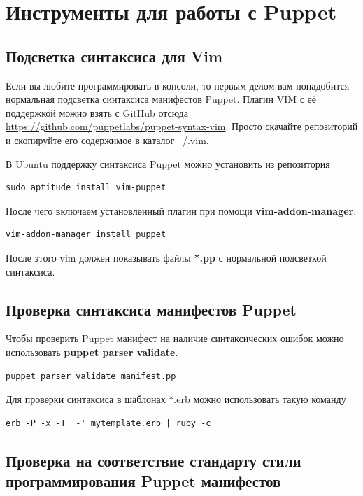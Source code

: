 \chapter{Инструменты для работы с Puppet}

\section{Подсветка синтаксиса для Vim}

Если вы любите программировать в консоли, то первым делом вам понадобится нормальная подсветка синтаксиса манифестов Puppet. Плагин VIM с её поддержкой можно взять с GitHub отсюда \url{https://github.com/puppetlabs/puppet-syntax-vim}. Просто скачайте репозиторий и скопируйте его содержимое в каталог ~/.vim.

В Ubuntu поддержку синтаксиса Puppet можно установить из репозитория

\begin{verbatim}
sudo aptitude install vim-puppet
\end{verbatim}

После чего включаем установленный плагин при помощи \textbf{vim-addon-manager}.

\begin{verbatim}
vim-addon-manager install puppet
\end{verbatim}

После этого vim должен показывать файлы \textbf{*.pp} с нормальной подсветкой синтаксиса.

\section{Проверка синтаксиса манифестов Puppet}

Чтобы проверить Puppet манифест на наличие синтаксических ошибок можно использовать \textbf{puppet parser validate}.

\begin{verbatim}
puppet parser validate manifest.pp
\end{verbatim}

Для проверки синтаксиса в шаблонах *.erb можно использовать такую команду 

\begin{verbatim}
erb -P -x -T '-' mytemplate.erb | ruby -c
\end{verbatim}

\section{Проверка на соответствие стандарту стили программирования Puppet манифестов}

